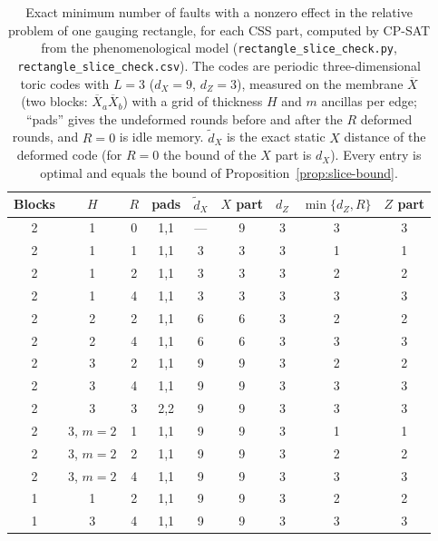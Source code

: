 \begin{table}[t]
\caption{Exact minimum number of faults with a nonzero effect in the relative
problem of one gauging rectangle, for each CSS part, computed by CP-SAT from
the phenomenological model (\texttt{rectangle\_slice\_check.py},
\texttt{rectangle\_slice\_check.csv}).  The codes are periodic
three-dimensional toric codes with $L=3$ ($d_X=9$, $d_Z=3$), measured on the
membrane $\overline X$ (two blocks: $\overline X_a\overline X_b$) with a grid of
thickness $H$ and $m$ ancillas per edge; ``pads'' gives the undeformed rounds
before and after the $R$ deformed rounds, and $R=0$ is idle memory.
$\widetilde d_X$ is the exact static $X$ distance of the deformed code (for
$R=0$ the bound of the $X$ part is $d_X$).  Every entry is optimal and equals
the bound of Proposition~\ref{prop:slice-bound}.}
\label{tab:slice-check}
\centering
\small
\begin{tabular}{@{}ccccccccc@{}}
\toprule
Blocks & $H$ & $R$ & pads & $\widetilde d_X$ & $X$ part & $d_Z$ & $\min\{d_Z,R\}$ & $Z$ part \\
\midrule
2 & 1 & 0 & 1,1 & --- & 9 & 3 & 3 & 3 \\
2 & 1 & 1 & 1,1 & 3 & 3 & 3 & 1 & 1 \\
2 & 1 & 2 & 1,1 & 3 & 3 & 3 & 2 & 2 \\
2 & 1 & 4 & 1,1 & 3 & 3 & 3 & 3 & 3 \\
2 & 2 & 2 & 1,1 & 6 & 6 & 3 & 2 & 2 \\
2 & 2 & 4 & 1,1 & 6 & 6 & 3 & 3 & 3 \\
2 & 3 & 2 & 1,1 & 9 & 9 & 3 & 2 & 2 \\
2 & 3 & 4 & 1,1 & 9 & 9 & 3 & 3 & 3 \\
2 & 3 & 3 & 2,2 & 9 & 9 & 3 & 3 & 3 \\
2 & 3, $m=2$ & 1 & 1,1 & 9 & 9 & 3 & 1 & 1 \\
2 & 3, $m=2$ & 2 & 1,1 & 9 & 9 & 3 & 2 & 2 \\
2 & 3, $m=2$ & 4 & 1,1 & 9 & 9 & 3 & 3 & 3 \\
1 & 1 & 2 & 1,1 & 9 & 9 & 3 & 2 & 2 \\
1 & 3 & 4 & 1,1 & 9 & 9 & 3 & 3 & 3 \\
\bottomrule
\end{tabular}
\end{table}
